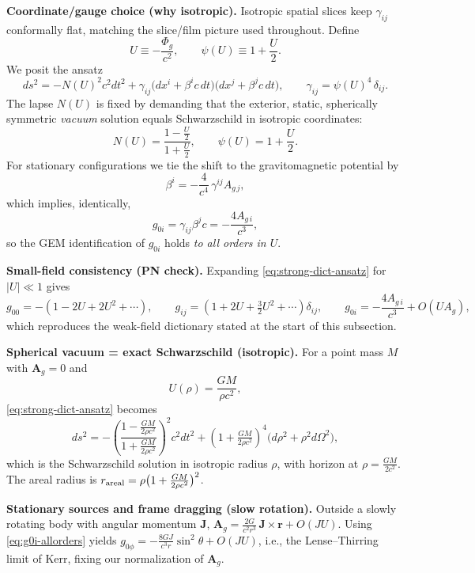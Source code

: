 \medskip
\noindent\textbf{Coordinate/gauge choice (why isotropic).}
Isotropic spatial slices keep \(\gamma_{ij}\) conformally flat, matching the slice/film picture used throughout. Define
\[
U\equiv -\frac{\Phi_g}{c^2},\qquad \psi(U)\equiv 1+\frac{U}{2}.
\]
We posit the ansatz
\begin{equation}
ds^2 = -N(U)^2 c^2 dt^2
+ \gamma_{ij}\big(dx^i+\beta^i c\,dt\big)\big(dx^j+\beta^j c\,dt\big),
\qquad \gamma_{ij}=\psi(U)^4\,\delta_{ij}.
\label{eq:strong-dict-ansatz}
\end{equation}
The lapse \(N(U)\) is fixed by demanding that the exterior, static, spherically symmetric \emph{vacuum} solution equals Schwarzschild in isotropic coordinates:
\begin{equation}
N(U)=\frac{1-\tfrac{U}{2}}{1+\tfrac{U}{2}},
\qquad \psi(U)=1+\frac{U}{2}.
\label{eq:Npsi}
\end{equation}
For stationary configurations we tie the shift to the gravitomagnetic potential by
\begin{equation}
\beta^i=-\frac{4}{c^4}\,\gamma^{ij} A_{g\,j},
\label{eq:beta-shift}
\end{equation}
which implies, identically,
\begin{equation}
g_{0i}=\gamma_{ij}\beta^j c=-\frac{4 A_{g\,i}}{c^3},
\label{eq:g0i-allorders}
\end{equation}
so the GEM identification of \(g_{0i}\) holds \emph{to all orders in \(U\)}.

\medskip
\noindent\textbf{Small-field consistency (PN check).}
Expanding \eqref{eq:strong-dict-ansatz} for \(|U|\ll 1\) gives
\[
g_{00}=-(1-2U+2U^2+\cdots),\qquad
g_{ij}=(1+2U+\tfrac{3}{2}U^2+\cdots)\delta_{ij},\qquad
g_{0i}=-\frac{4A_{g\,i}}{c^3}+O(UA_g),
\]
which reproduces the weak-field dictionary stated at the start of this subsection.

\medskip
\noindent\textbf{Spherical vacuum = exact Schwarzschild (isotropic).}
For a point mass \(M\) with \(\mathbf A_g=0\) and
\[
U(\rho)=\frac{GM}{\rho c^2},
\]
\eqref{eq:strong-dict-ansatz} becomes
\[
ds^2=-\left(\frac{1-\tfrac{GM}{2\rho c^2}}{1+\tfrac{GM}{2\rho c^2}}\right)^{\!2}c^2dt^2
+\left(1+\tfrac{GM}{2\rho c^2}\right)^{\!4}\big(d\rho^2+\rho^2 d\Omega^2\big),
\]
which is the Schwarzschild solution in isotropic radius \(\rho\), with horizon at \(\rho=\tfrac{GM}{2c^2}\).
The areal radius is \(r_{\rm areal}=\rho\big(1+\tfrac{GM}{2\rho c^2}\big)^{2}\).

\medskip
\noindent\textbf{Stationary sources and frame dragging (slow rotation).}
Outside a slowly rotating body with angular momentum \(\mathbf J\),
\(\mathbf A_g=\tfrac{2G}{c^2 r^3}\,\mathbf J\times\mathbf r + O(JU)\).
Using \eqref{eq:g0i-allorders} yields \(g_{0\phi}=-\tfrac{8GJ}{c^3 r}\sin^2\theta+O(JU)\),
i.e., the Lense--Thirring limit of Kerr, fixing our normalization of \(\mathbf A_g\).

